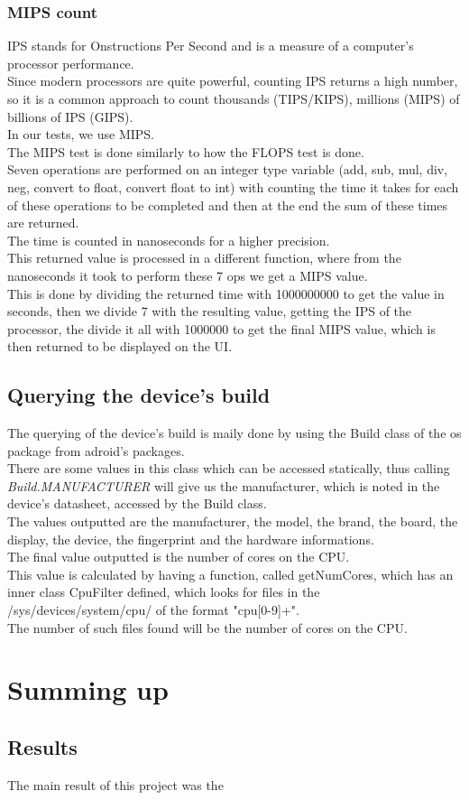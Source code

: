 \documentclass[a4paper,10pt]{report}
\begin{document}
 \subsection{MIPS count}
 IPS stands for Onstructions Per Second and is a measure of a computer's processor performance.\\
 Since modern processors are quite powerful, counting IPS returns a high number, so it is a common approach to count thousands (TIPS/KIPS), millions (MIPS) of billions of IPS (GIPS).\\
 In our tests, we use MIPS.\\
 The MIPS test is done similarly to how the FLOPS test is done. \\
 Seven operations are performed on an integer type variable (add, sub, mul, div, neg, convert to float, convert float to int) with counting the time it takes for each of these operations to be completed and then at the end the sum of these times are returned.\\
 The time is counted in nanoseconds for a higher precision.\\
 This returned value is processed in a different function, where from the nanoseconds it took to perform these 7 ops we get a MIPS value.\\
 This is done by dividing the returned time with 1000000000 to get the value in seconds, then we divide 7 with the resulting value, getting the IPS of the processor, the divide it all with 1000000 to get the final MIPS value, which is then returned to be displayed on the UI.\\
 
 \section{Querying the device's build}
 The querying of the device's build is maily done by using the Build class of the os package from adroid's packages.\\
 There are some values in this class which can be accessed statically, thus calling \textit{Build.MANUFACTURER} will give us the manufacturer, which is noted in the device's datasheet, accessed by the Build class.\\
 The values outputted are the manufacturer, the model, the brand, the board, the display, the device, the fingerprint and the hardware informations.\\
 The final value outputted is the number of cores on the CPU.\\
 This value is calculated by having a function, called getNumCores, which has an inner class CpuFilter defined, which looks for files in the /sys/devices/system/cpu/ of the format "cpu[0-9]+".\\
 The number of such files found will be the number of cores on the CPU.\\
 
\chapter{Summing up}
 \section{Results}
 The main result of this project was the 
 
\end{document}
